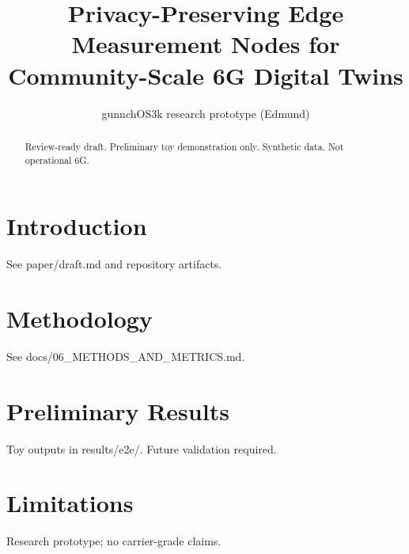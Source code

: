 \documentclass{article}
\title{Privacy-Preserving Edge Measurement Nodes for Community-Scale 6G Digital Twins}
\author{gunnchOS3k research prototype (Edmund)}
\begin{document}
\maketitle
\begin{abstract}
Review-ready draft. Preliminary toy demonstration only. Synthetic data. Not operational 6G.
\end{abstract}
\section{Introduction}
See paper/draft.md and repository artifacts.
\section{Methodology}
See docs/06\_METHODS\_AND\_METRICS.md.
\section{Preliminary Results}
Toy outputs in results/e2e/. Future validation required.
\section{Limitations}
Research prototype; no carrier-grade claims.


\end{document}
